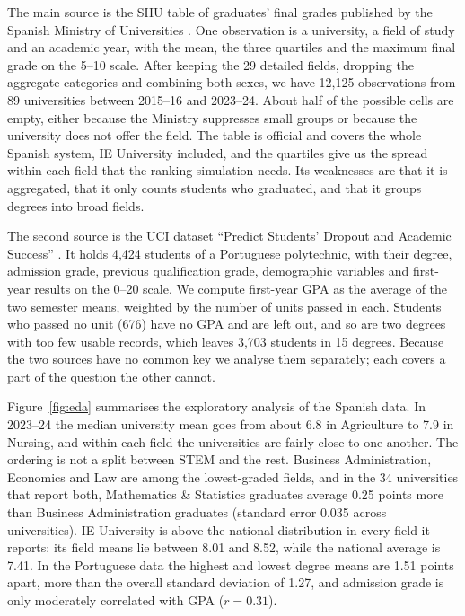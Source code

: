 \documentclass[clean]{bam-proposal}
\begin{document}
The main source is the SIIU table of graduates' final grades published by the Spanish Ministry of Universities \cite{siiu2025}. One observation is a university, a field of study and an academic year, with the mean, the three quartiles and the maximum final grade on the 5--10 scale. After keeping the 29 detailed fields, dropping the aggregate categories and combining both sexes, we have 12,125 observations from 89 universities between 2015--16 and 2023--24. About half of the possible cells are empty, either because the Ministry suppresses small groups or because the university does not offer the field. The table is official and covers the whole Spanish system, IE University included, and the quartiles give us the spread within each field that the ranking simulation needs. Its weaknesses are that it is aggregated, that it only counts students who graduated, and that it groups degrees into broad fields.

The second source is the UCI dataset ``Predict Students' Dropout and Academic Success'' \cite{realinho2021uci,realinho2022data}. It holds 4,424 students of a Portuguese polytechnic, with their degree, admission grade, previous qualification grade, demographic variables and first-year results on the 0--20 scale. We compute first-year GPA as the average of the two semester means, weighted by the number of units passed in each. Students who passed no unit (676) have no GPA and are left out, and so are two degrees with too few usable records, which leaves 3,703 students in 15 degrees. Because the two sources have no common key we analyse them separately; each covers a part of the question the other cannot.

Figure~\ref{fig:eda} summarises the exploratory analysis of the Spanish data. In 2023--24 the median university mean goes from about 6.8 in Agriculture to 7.9 in Nursing, and within each field the universities are fairly close to one another. The ordering is not a split between STEM and the rest. Business Administration, Economics and Law are among the lowest-graded fields, and in the 34 universities that report both, Mathematics \& Statistics graduates average 0.25 points more than Business Administration graduates (standard error 0.035 across universities). IE University is above the national distribution in every field it reports: its field means lie between 8.01 and 8.52, while the national average is 7.41. In the Portuguese data the highest and lowest degree means are 1.51 points apart, more than the overall standard deviation of 1.27, and admission grade is only moderately correlated with GPA ($r = 0.31$).
\end{document}
